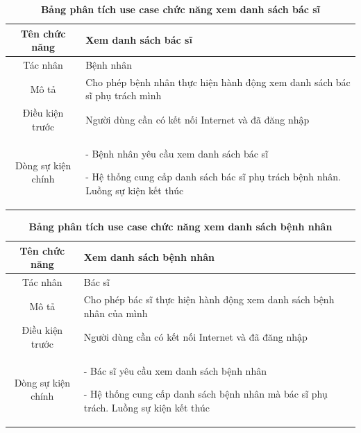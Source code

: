   \begin{table}[H]
    \caption{\bfseries \fontsize{12pt}{0pt}\selectfont Bảng phân tích use case chức năng xem danh sách bác sĩ}
    \centering
    \begin{tabularx}{0.9\textwidth}{|c|X|}
      \hline
      \textbf{Tên chức năng} & \textbf{Xem danh sách bác sĩ} \\
      \hline
      Tác nhân & Bệnh nhân \\
      \hline
      Mô tả & Cho phép bệnh nhân thực hiện hành động xem danh sách bác sĩ phụ trách mình \\
      \hline
      Điều kiện trước & Người dùng cần có kết nối Internet và đã đăng nhập \\
      \hline
      Dòng sự kiện chính & 
        - Bệnh nhân yêu cầu xem danh sách bác sĩ
        
        - Hệ thống cung cấp danh sách bác sĩ phụ trách bệnh nhân. Luồng sự kiện kết thúc        
        \\
      \hline
    \end{tabularx}
  \end{table}

  \begin{table}[H]
    \caption{\bfseries \fontsize{12pt}{0pt}\selectfont Bảng phân tích use case chức năng xem danh sách bệnh nhân}
    \centering
    \begin{tabularx}{0.9\textwidth}{|c|X|}
      \hline
      \textbf{Tên chức năng} & \textbf{Xem danh sách bệnh nhân} \\
      \hline
      Tác nhân & Bác sĩ \\
      \hline
      Mô tả & Cho phép bác sĩ thực hiện hành động xem danh sách bệnh nhân của mình \\
      \hline
      Điều kiện trước & Người dùng cần có kết nối Internet và đã đăng nhập \\
      \hline
      Dòng sự kiện chính & 
        - Bác sĩ yêu cầu xem danh sách bệnh nhân
        
        - Hệ thống cung cấp danh sách bệnh nhân mà bác sĩ phụ trách. Luồng sự kiện kết thúc         
        \\
      \hline
    \end{tabularx}
  \end{table}
  

